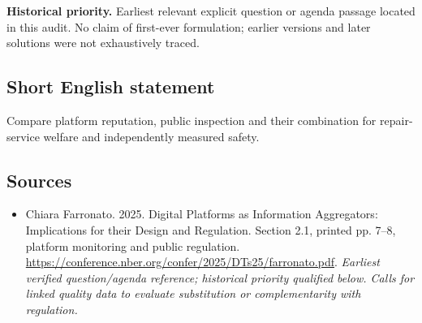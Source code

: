 \documentclass[11pt]{article}
\begin{document}
\par\textbf{Historical priority.} Earliest relevant explicit question or agenda passage located in this audit. No claim of first-ever formulation; earlier versions and later solutions were not exhaustively traced.

\subsection{Short English statement}
Compare platform reputation, public inspection and their combination for repair-service welfare and independently measured safety.

\subsection{Sources}
\begin{itemize}\raggedright
\item[\textnormal{[S1]}]\hypertarget{source:30007687:1}{} Chiara Farronato. 2025. Digital Platforms as Information Aggregators: Implications for their Design and Regulation. Section 2.1, printed pp. 7–8, platform monitoring and public regulation.
\url{https://conference.nber.org/confer/2025/DTs25/farronato.pdf}.
{\small\textit{Earliest verified question/agenda reference; historical priority qualified below. Calls for linked quality data to evaluate substitution or complementarity with regulation.}}
\end{itemize}
\end{document}

